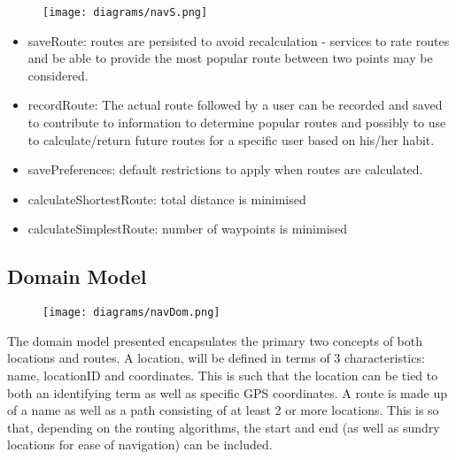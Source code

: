 \documentclass[12pt]{article}
\begin{document}
\begin{figure}
\centering
\texttt{[image: diagrams/navS.png]}

\end{figure}
\begin{itemize}
\item saveRoute: routes are persisted to avoid recalculation - services to rate routes and be able to provide the most popular route between two points may be considered. 

\item recordRoute: The actual route followed by a user can be recorded and saved to contribute to information to determine popular routes and possibly to use to calculate/return future routes for a specific user based on his/her habit.
\item savePreferences: default restrictions to apply when routes are calculated.

\item calculateShortestRoute: total distance is minimised 

\item calculateSimplestRoute: number of waypoints is minimised
\end{itemize}
 

\subsection{Domain Model}
\begin{figure}[h]
\centering
\texttt{[image: diagrams/navDom.png]}

\end{figure}
The domain model presented encapsulates the primary two concepts of both locations and routes. A location, will be defined in terms of 3 characteristics: name, locationID and coordinates. This is such that the location can be tied to both an identifying term as well as specific GPS coordinates. 
A route is made up of a name as well as a path consisting of at least 2 or more locations. This is so that, depending on the routing algorithms, the start and end (as well as sundry locations for ease of navigation) can be included.
\end{document}
